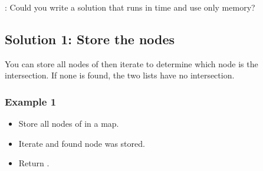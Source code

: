 \documentclass[letterpaper,12pt,english]{book}
\begin{document}
\sphinxAtStartPar
{}: Could you write a solution that runs in  time and use only  memory?


\subsection{Solution 1: Store the nodes}
\label{\detokenize{Linked_List/02_LL_160_Intersection_of_Two_Linked_Lists:solution-1-store-the-nodes}}
\sphinxAtStartPar
You can store all nodes of  then iterate  to determine which node is the intersection. If none is found, the two lists have no intersection.


\subsubsection{Example 1}
\label{\detokenize{Linked_List/02_LL_160_Intersection_of_Two_Linked_Lists:id1}}\begin{itemize}
\item {} 
\sphinxAtStartPar
Store all nodes of  in a map.

\item {} 
\sphinxAtStartPar
Iterate  and found node \sphinxcode{\sphinxupquote{\textquotesingle{}8\textquotesingle{}}} was stored.

\item {} 
\sphinxAtStartPar
Return \sphinxcode{\sphinxupquote{\textquotesingle{}8\textquotesingle{}}}.

\end{itemize}
\end{document}
